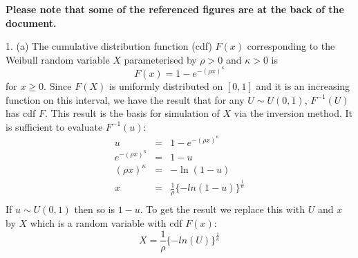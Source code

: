 \documentclass[a4paper,11pt]{article}
\begin{document}
{\bf Please note that some of the referenced figures are at the back of the document.}

1. (a) The cumulative distribution function (cdf) $F(x)$ corresponding to the
Weibull random variable $X$ parameterised by $\rho > 0$ and $\kappa > 0$ is
\begin{equation*}
  F(x) = 1 - e^{-(\rho x)^\kappa}
\end{equation*}
for $x \ge 0$. Since $F(X)$ is uniformly distributed on $[0,1]$ and it
is an increasing function on this interval, we have the result that
for any $U \sim U(0,1)$, $F^{-1}(U)$ has cdf $F$. This result is the
basis for simulation of $X$ via the  inversion method. It is
sufficient to evaluate $F^{-1}(u)$:
\begin{eqnarray*}
  u & = & 1 - e^{-(\rho x)^\kappa} \\
  e^{-(\rho x)^\kappa} & = & 1-u\\
  (\rho x)^\kappa & = & -\ln(1-u) \\
  x & = & \frac{1}{\rho} \{ -ln(1-u) \} ^{\frac{1}{\kappa}}\\
  \end{eqnarray*}
If $u\sim U(0,1)$ then so is $1-u$. To get the result we replace this with $U$ and $x$ by
$X$ which is a random variable with cdf $F(x)$:
\begin{equation*}
  X = \frac{1}{\rho} \{ -ln(U) \} ^{\frac{1}{\kappa}}
  \end{equation*}
\end{document}
